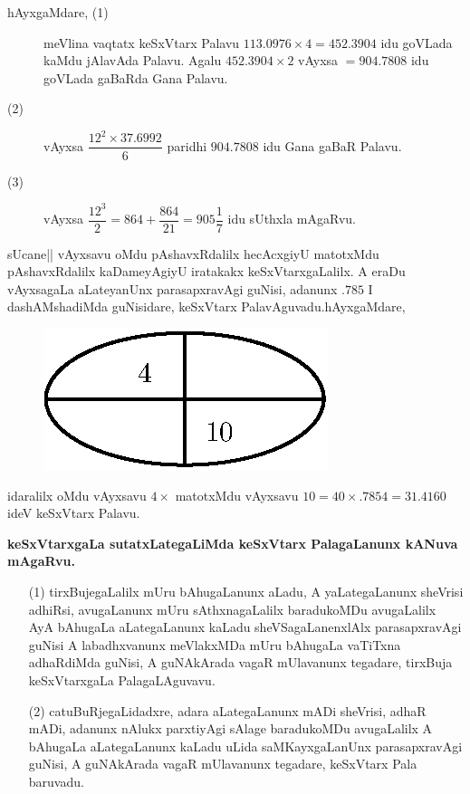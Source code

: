 \begin{description}
\item[\textmd{hAyxgaMdare,} \rm(1)]
meVlina vaqtatx keSxVtarx Palavu $113.0976\times 4=452.3904$ idu
goVLada kaMdu jAlavAda Palavu. Agalu $452.3904\times 2$ vAyxsa
$=904.7808$ idu goVLada gaBaRda Gana Palavu.

\item[\rm(2)] vAyxsa $\dfrac{12^{2}\times 37.6992}{6}$ paridhi
$904.7808$ idu Gana gaBaR Palavu.

\item[\rm(3)] vAyxsa
$\dfrac{12^{3}}{2}=864+\dfrac{864}{21}=905\dfrac{1}{7}$ idu sUthxla mAgaRvu.
\end{description}

sUcane|| vAyxsavu oMdu pAshavxRdalilx hecAcxgiyU matotxMdu
pAshavxRdalilx kaDameyAgiyU iratakakx keSxVtarxgaLalilx. A eraDu
vAyxsagaLa aLateyanUnx parasapxravAgi guNisi, adanunx $.785$ I
dashAMshadiMda guNisidare, keSxVtarx PalavAguvadu.\quad hAyxgaMdare,
\begin{figure}[H]
\centering
\includegraphics{figure/fig23.eps}
\end{figure}

idaralilx oMdu vAyxsavu $4\times$ matotxMdu vAyxsavu $10=40\times
.7854=31.4160$ ideV keSxVtarx Palavu.

\medskip
\begin{center}
{\bf keSxVtarxgaLa sutatxLategaLiMda keSxVtarx PalagaLanunx kANuva mAgaRvu.}
\end{center}

\begin{itemize}
\item[\rm(1)] tirxBujegaLalilx mUru bAhugaLanunx aLadu, A
yaLategaLanunx sheVrisi adhiRsi, avugaLanunx mUru sAthxnagaLalilx
baradukoMDu avugaLalilx AyA bAhugaLa aLategaLanunx kaLadu
sheVSagaLanenxlAlx parasapxravAgi guNisi A labadhxvanunx meVlakxMDa
mUru bAhugaLa vaTiTxna adhaRdiMda guNisi, A guNAkArada vagaR
mUlavanunx tegadare, tirxBuja keSxVtarxgaLa PalagaLAguvavu.

\item[\rm(2)] catuBuRjegaLidadxre, adara aLategaLanunx mADi sheVrisi,
adhaR mADi, adanunx nAlukx parxtiyAgi sAlage baradukoMDu avugaLalilx A
bAhugaLa aLategaLanunx kaLadu uLida saMKayxgaLanUnx parasapxravAgi
guNisi, A guNAkArada vagaR mUlavanunx tegadare, keSxVtarx Pala
baruvadu. 
\end{itemize}



